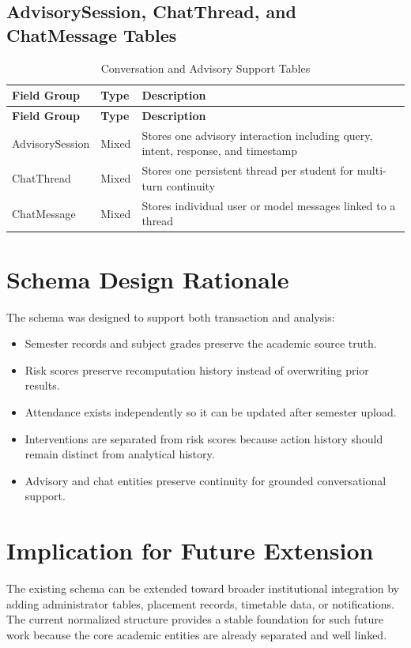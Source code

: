 \subsection{AdvisorySession, ChatThread, and ChatMessage Tables}
\begin{longtable}{p{}p{}p{}}
\caption{Conversation and Advisory Support Tables}\\
\toprule
\textbf{Field Group} & \textbf{Type} & \textbf{Description} \\
\midrule
\endfirsthead
\toprule
\textbf{Field Group} & \textbf{Type} & \textbf{Description} \\
\midrule
\endhead
AdvisorySession & Mixed & Stores one advisory interaction including query, intent, response, and timestamp \\
ChatThread & Mixed & Stores one persistent thread per student for multi-turn continuity \\
ChatMessage & Mixed & Stores individual user or model messages linked to a thread \\
\bottomrule
\end{longtable}

\section{Schema Design Rationale}
The schema was designed to support both transaction and analysis:
\begin{itemize}[leftmargin=*]
\item Semester records and subject grades preserve the academic source truth.
\item Risk scores preserve recomputation history instead of overwriting prior results.
\item Attendance exists independently so it can be updated after semester upload.
\item Interventions are separated from risk scores because action history should remain distinct from analytical history.
\item Advisory and chat entities preserve continuity for grounded conversational support.
\end{itemize}

\section{Implication for Future Extension}
The existing schema can be extended toward broader institutional integration by adding administrator tables, placement records, timetable data, or notifications. The current normalized structure provides a stable foundation for such future work because the core academic entities are already separated and well linked.
